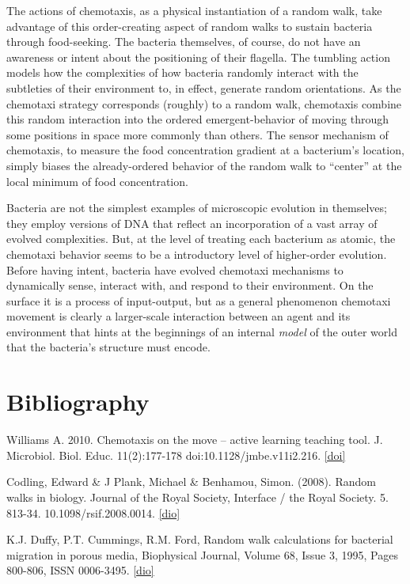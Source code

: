\documentclass{article}
\begin{document}
  The actions of chemotaxis, as a physical instantiation of a random walk, take advantage of this order-creating aspect of random walks to sustain bacteria through food-seeking. The bacteria themselves, of course, do not have an awareness or intent about the positioning of their flagella. The tumbling action models how the complexities of how bacteria randomly interact with the subtleties of their environment to, in effect, generate random orientations. As the chemotaxi strategy corresponds (roughly) to a random walk, chemotaxis combine this random interaction into the ordered emergent-behavior of moving through some positions in space more commonly than others. The sensor mechanism of chemotaxis, to measure the food concentration gradient at a bacterium's location, simply biases the already-ordered behavior of the random walk to ``center'' at the local minimum of food concentration.





  Bacteria are not the simplest examples of microscopic evolution in themselves; they employ versions of DNA that reflect an incorporation of a vast array of evolved complexities. But, at the level of treating each bacterium as atomic, the chemotaxi behavior seems to be a introductory level of higher-order evolution. Before having intent, bacteria have evolved chemotaxi mechanisms to dynamically sense, interact with, and respond to their environment. On the surface it is a process of input-output, but as a general phenomenon chemotaxi movement is clearly a larger-scale interaction between an agent and its environment that hints at the beginnings of an internal \textit{model} of the outer world that the bacteria's structure must encode.






\section*{Bibliography}


\noindent 
  Williams A. 2010. Chemotaxis on the move – active learning teaching tool. J. Microbiol. Biol. Educ. 11(2):177-178 doi:10.1128/jmbe.v11i2.216. 
\href{https://dx.doi.org/10.1128%2Fjmbe.v11i2.216}{[doi]}

\vspace*{0.2cm}


\noindent 
  Codling, Edward \& J Plank, Michael \& Benhamou, Simon. (2008). Random walks in biology. Journal of the Royal Society, Interface / the Royal Society. 5. 813-34. 10.1098/rsif.2008.0014. 
\href{https://doi.org/10.1098/rsif.2008.0014}{[dio]}

\vspace*{0.2cm}


\noindent 
  K.J. Duffy, P.T. Cummings, R.M. Ford, Random walk calculations for bacterial migration in porous media, Biophysical Journal, Volume 68, Issue 3, 1995, Pages 800-806, ISSN 0006-3495. 
\href{https://doi.org/10.1016/S0006-3495(95)80256-0}{[dio]}

\vspace*{0.2cm}
\end{document}
